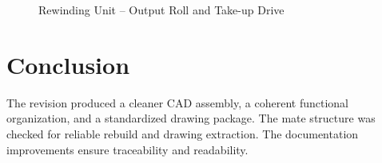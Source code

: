 \begin{figure}[H]
\centering
{}
\caption{Rewinding Unit -- Output Roll and Take-up Drive}
\label{fig:chapter2-6}
\end{figure}

\section*{Conclusion}

The revision produced a cleaner CAD assembly, a coherent functional organization, and a standardized drawing package. The mate structure was checked for reliable rebuild and drawing extraction. The documentation improvements ensure traceability and readability.